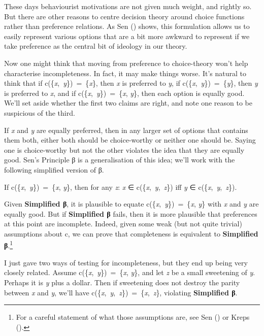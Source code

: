 \documentclass[
  10pt,
  letterpaper,
  DIV=11,
  numbers=noendperiod,
  twoside]{scrartcl}
\providecommand{\tightlist}{%
  \setlength{\itemsep}{0pt}\setlength{\parskip}{0pt}}\usepackage{longtable,booktabs,array}
\begin{document}
These days behaviourist motivations are not given much weight, and
rightly so. But there are other reasons to centre decision theory around
choice functions rather than preference relations. As Sen
() shows, this formulation allows us to
easily represent various options that are a bit more awkward to
represent if we take preference as the central bit of ideology in our
theory.

Now one might think that moving from preference to choice-theory won't
help characterise incompleteness. In fact, it may make things worse.
It's natural to think that if c(\{\emph{x},~\emph{y}\})~=~\{\emph{x}\},
then \emph{x} is preferred to \emph{y}, if
c(\{\emph{x},~\emph{y}\})~=~\{\emph{y}\}, then \emph{y} is preferred to
\emph{x}, and if c(\{\emph{x},~\emph{y}\})~=~\{\emph{x}, \emph{y}\},
then each option is equally good. We'll set aside whether the first two
claims are right, and note one reason to be suspicious of the third.

If \emph{x} and \emph{y} are equally preferred, then in any larger set
of options that contains them both, either both should be choice-worthy
or neither one should be. Saying one is choice-worthy but not the other
violates the idea that they are equally good. Sen's Principle β is a
generalisation of this idea; we'll work with the following simplified
version of β.

\begin{description}
\tightlist
\item[Simplified β]
If c(\{\emph{x},~\emph{y}\})~=~\{\emph{x}, \emph{y}\}, then for any
\emph{z}: \emph{x} ∈ c(\{\emph{x},~\emph{y},~\emph{z}\}) iff \emph{y} ∈
c(\{\emph{x},~\emph{y},~\emph{z}\}).
\end{description}

Given \textbf{Simplified β}, it is plausible to equate
c(\{\emph{x},~\emph{y}\})~=~\{\emph{x}, \emph{y}\} with \emph{x} and
\emph{y} are equally good. But if \textbf{Simplified β} fails, then it
is more plausible that preferences at this point are incomplete. Indeed,
given some weak (but not quite trivial) assumptions about c, we can
prove that completeness is equivalent to \textbf{Simplified
β}.\footnote{For a careful statement of what those assumptions are, see
  Sen () or Kreps
  ().}

I just gave two ways of testing for incompleteness, but they end up
being very closely related. Assume
c(\{\emph{x},~\emph{y}\})~=~\{\emph{x}, \emph{y}\}, and let \emph{z} be
a small sweetening of \emph{y}. Perhaps it is \emph{y} plus a dollar.
Then if sweetening does not destroy the parity between \emph{x} and
\emph{y}, we'll have
c(\{\emph{x},~\emph{y},~\emph{z}\})~=~\{\emph{x},~\emph{z}\}, violating
\textbf{Simplified β}.
\end{document}
